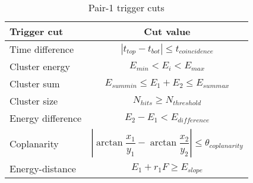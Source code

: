 \begin{table}[H]
\caption{Pair-1 trigger cuts}
\label{tab:pairTriggerCuts}
\centering
\begin{tabular}{lc}
\toprule
Trigger cut & Cut value \\
\midrule
Time difference & $| t_{top}-t_{bot} | \leq t_{coincidence}$   \\
Cluster energy & $E_{min}<E_{i}<E_{max}$\\
Cluster sum & $E_{sum min}\leq E_1+E_2\leq E_{sum max}$\\
Cluster size & $N_{hits}\geq N_{threshold}$\\
Energy difference & $ E_{2}-E_{1}<E_{difference}$\\
Coplanarity & $ |\arctan\dfrac{x_1}{y_1}-\arctan\dfrac{x_2}{y_2} | \leq \theta_{coplanarity}$\\
Energy-distance & $E_{1}+r_{1}F\geq E_{slope}$ \\ 
\bottomrule
\end{tabular}
\end{table}

